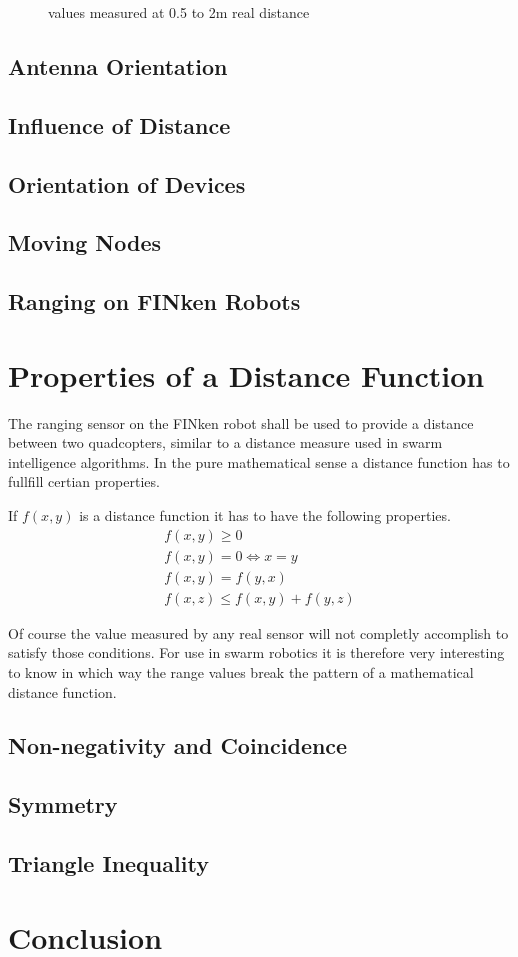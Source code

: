\begin{figure}[H]
	\centering
	
	\caption{values measured at 0.5 to 2m real distance}
	\label{range_05_to_2m}
\end{figure}
\subsection{Antenna Orientation}


\subsection{Influence of Distance}

\subsection{Orientation of Devices}


\subsection{Moving Nodes}

\subsection{Ranging on FINken Robots}

\section{Properties of a Distance Function}
The ranging sensor on the FINken robot shall be used to provide a distance between two quadcopters, similar to a distance measure used in swarm intelligence algorithms.
In the pure mathematical sense a distance function has to fullfill certian properties.

If $f(x, y)$ is a distance function it has to have the following properties.
\begin{eqnarray}
f(x, y) \ge 0 \\
f(x, y) = 0 \iff x = y \\ 
f(x, y) = f(y, x) \\ 
f(x, z) \le f(x, y) + f(y, z)
\end{eqnarray}

Of course the value measured by any real sensor will not completly accomplish to satisfy those conditions.
For use in swarm robotics it is therefore very interesting to know in which way the range values break the pattern of a mathematical distance function.

\subsection{Non-negativity and Coincidence}

\subsection{Symmetry}

\subsection{Triangle Inequality}



\section{Conclusion}

